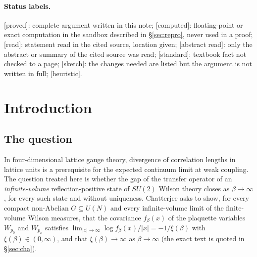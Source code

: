 \documentclass[11pt,a4paper]{article}
\theoremstyle{plain}
\theoremstyle{definition}
\theoremstyle{remark}
\numberwithin{equation}{section}
\newcommand{\st}[1]{\textsf{[#1]}}
\begin{document}
\begin{abstract}
This note proves neither part of Chatterjee's Problem~5.1 in \emph{Yang--Mills for probabilists}. That problem asks for a finite positive
correlation length of the plaquette--plaquette covariance at every $\beta$, in every infinite-volume limit, and then for its divergence;
our result concerns the inverse transfer-operator gap, which bounds the temporal correlation length from above for states common to
the two classes. Neither inclusion between these classes is established here.
The rate is a power of $\beta$; we obtain no exponential rate, no information on the gap at moderate $\beta$, and nothing uniform in the volume at fixed coupling.
An adaptation of the argument to the $U(1)$ Wilson action is outlined in Remark~\ref{rem:U1}. For the different Villain action,
masslessness of the photon at weak coupling is known. The gap-vanishing mechanism therefore does not distinguish $SU(2)$ from $U(1)$
and establishes no confinement statement.
\end{abstract}

\paragraph{Status labels.}
\st{proved}: complete argument written in this note; \st{computed}: floating-point or exact computation in the sandbox described in
\S\ref{sec:repro}, never used in a proof; \st{read}: statement read in the cited source, location given; \st{abstract read}: only the
abstract or summary of the cited source was read; \st{standard}: textbook fact not checked to a page; \st{sketch}: the changes needed
are listed but the argument is not written in full; \st{heuristic}.

{\small\setcounter{tocdepth}{1}\tableofcontents}

\section{Introduction}\label{sec:intro}

\subsection{The question}
In four-dimensional lattice gauge theory, divergence of correlation lengths in lattice units is a prerequisite for the expected
continuum limit at weak coupling. The question treated here is whether the gap of the transfer operator of an \emph{infinite-volume}
reflection-positive state of $SU(2)$ Wilson theory closes as $\beta\to\infty$, for every such state and without uniqueness.
Chatterjee \cite[\S5, Problem~5.1, p.~9]{Cha18} asks to show, for every compact non-Abelian
$G\subseteq U(N)$ and every infinite-volume limit of the finite-volume Wilson measures, that the covariance $f_\beta(x)$ of the plaquette
variables $W_{p_0}$ and $W_{p_x}$ satisfies $\lim_{|x|\to\infty}\log f_\beta(x)/|x|=-1/\xi(\beta)$ with $\xi(\beta)\in(0,\infty)$, and
that $\xi(\beta)\to\infty$ as $\beta\to\infty$ (the exact text is quoted in \S\ref{sec:cha}).
\end{document}
